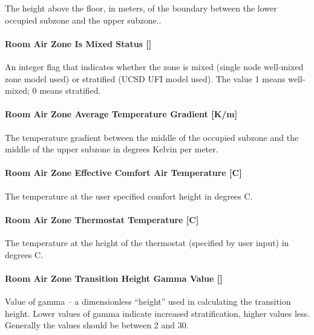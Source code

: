 The height above the floor, in meters, of the boundary between the lower occupied subzone and the upper subzone..

\paragraph{Room Air Zone Is Mixed Status {[]}}\label{room-air-zone-is-mixed-status-1}

An integer flag that indicates whether the zone is mixed (single node well-mixed zone model used) or stratified (UCSD UFI model used). The value 1 means well-mixed; 0 means stratified.

\paragraph{Room Air Zone Average Temperature Gradient {[}K/m{]}}\label{room-air-zone-average-temperature-gradient-km-1}

The temperature gradient between the middle of the occupied subzone and the middle of the upper subzone in degrees Kelvin per meter.

\paragraph{Room Air Zone Effective Comfort Air Temperature {[}C{]}}\label{room-air-zone-effective-comfort-air-temperature-c}

The temperature at the user specified comfort height in degrees C.

\paragraph{Room Air Zone Thermostat Temperature {[}C{]}}\label{room-air-zone-thermostat-temperature-c-1}

The temperature at the height of the thermostat (specified by user input) in degrees C.

\paragraph{Room Air Zone Transition Height Gamma Value {[]}}\label{room-air-zone-transition-height-gamma-value}

Value of gamma -- a dimensionless ``height'' used in calculating the transition height. Lower values of gamma indicate increased stratification, higher values less. Generally the values should be between 2 and 30.

